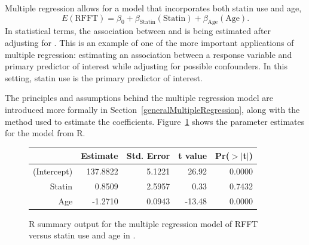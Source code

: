 \textD{\newpage}

Multiple regression allows for a model that incorporates both statin use and age,
 \[
    E(\text{RFFT}) = \beta_0 + \beta_{\text{Statin}}(\text{Statin}) + \beta_{\text{Age}}(\text{Age}).
	\label{RFFTStatinAgeEquation}
 \]
In statistical terms, the association between  and  is being estimated after adjusting for . This is an example of one of the more important applications of multiple regression: estimating an association between a response variable and primary predictor of interest while adjusting for possible confounders. In this setting, statin use is the primary predictor of interest.

The principles and assumptions behind the multiple regression model are introduced more formally in Section~\ref{generalMultipleRegression}, along with the method used to estimate the coefficients. Figure~\ref{prevendRFFTStatinAgeRegression} shows the parameter estimates for the model from \textsf{R}. 
\begin{figure}[ht]
\centering
\begin{tabular}{rrrrr}
  \hline
 & Estimate & Std. Error & t value & Pr($>$$|$t$|$) \\ 
  \hline
(Intercept) & 137.8822 & 5.1221 & 26.92 & 0.0000 \\ 
  Statin & 0.8509 & 2.5957 & 0.33 & 0.7432 \\ 
  Age & -1.2710 & 0.0943 & -13.48 & 0.0000 \\ 
   \hline
\end{tabular}
\caption{\textsf{R} summary output for the multiple regression model of RFFT versus statin use and age in .} 
\label{prevendRFFTStatinAgeRegression}
\end{figure}
 
